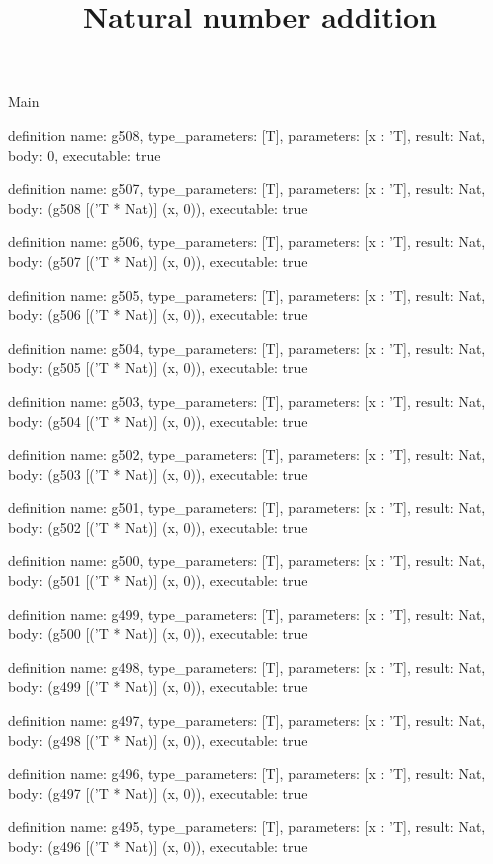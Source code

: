 \begin{lexlean}{Main}
\title{Natural number addition}
\begin{semanticmodule}
definition{
  name: g508,
  type_parameters: [T],
  parameters: [x : 'T],
  result: Nat,
  body: 0,
  executable: true
}

definition{
  name: g507,
  type_parameters: [T],
  parameters: [x : 'T],
  result: Nat,
  body: (g508 [('T * Nat)] (x, 0)),
  executable: true
}

definition{
  name: g506,
  type_parameters: [T],
  parameters: [x : 'T],
  result: Nat,
  body: (g507 [('T * Nat)] (x, 0)),
  executable: true
}

definition{
  name: g505,
  type_parameters: [T],
  parameters: [x : 'T],
  result: Nat,
  body: (g506 [('T * Nat)] (x, 0)),
  executable: true
}

definition{
  name: g504,
  type_parameters: [T],
  parameters: [x : 'T],
  result: Nat,
  body: (g505 [('T * Nat)] (x, 0)),
  executable: true
}

definition{
  name: g503,
  type_parameters: [T],
  parameters: [x : 'T],
  result: Nat,
  body: (g504 [('T * Nat)] (x, 0)),
  executable: true
}

definition{
  name: g502,
  type_parameters: [T],
  parameters: [x : 'T],
  result: Nat,
  body: (g503 [('T * Nat)] (x, 0)),
  executable: true
}

definition{
  name: g501,
  type_parameters: [T],
  parameters: [x : 'T],
  result: Nat,
  body: (g502 [('T * Nat)] (x, 0)),
  executable: true
}

definition{
  name: g500,
  type_parameters: [T],
  parameters: [x : 'T],
  result: Nat,
  body: (g501 [('T * Nat)] (x, 0)),
  executable: true
}

definition{
  name: g499,
  type_parameters: [T],
  parameters: [x : 'T],
  result: Nat,
  body: (g500 [('T * Nat)] (x, 0)),
  executable: true
}

definition{
  name: g498,
  type_parameters: [T],
  parameters: [x : 'T],
  result: Nat,
  body: (g499 [('T * Nat)] (x, 0)),
  executable: true
}

definition{
  name: g497,
  type_parameters: [T],
  parameters: [x : 'T],
  result: Nat,
  body: (g498 [('T * Nat)] (x, 0)),
  executable: true
}

definition{
  name: g496,
  type_parameters: [T],
  parameters: [x : 'T],
  result: Nat,
  body: (g497 [('T * Nat)] (x, 0)),
  executable: true
}

definition{
  name: g495,
  type_parameters: [T],
  parameters: [x : 'T],
  result: Nat,
  body: (g496 [('T * Nat)] (x, 0)),
  executable: true
}


\end{semanticmodule}
\end{lexlean}
